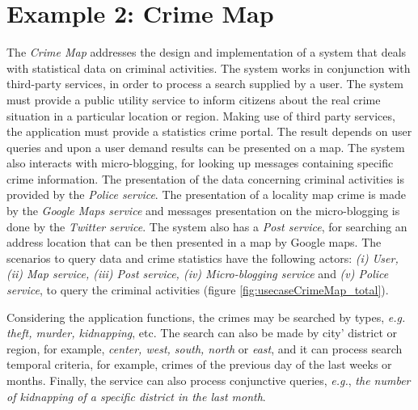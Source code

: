  


   

 
\section{Example 2: Crime Map}
\label{sec:crimes_inpractice}


The \textit{Crime Map}  addresses the design and
implementation of a system that deals with statistical data on criminal activities. The system works
in conjunction with third-party services, in order to process a search supplied
by a user. The system must provide a public utility service to inform
citizens about the real crime situation in a particular location or region.
Making use of third party services, the application must provide a statistics crime portal. The result depends on user queries and upon a user
demand results can be presented on a map. The system also interacts with
micro-blogging, for looking up messages containing specific crime
information. The presentation of the data concerning criminal activities is
provided by the \textit{Police service}. The presentation of a locality map
crime is made by the \textit{Google Maps service} and messages presentation on
the micro-blogging is done by the \textit{Twitter service}. The system also has
a \textit{Post service}, for searching an address location that can be then
presented in a map by Google maps. The scenarios to query data and crime
statistics have the following actors: \textit{(i) User, (ii) Map service, (iii) Post service, (iv) Micro-blogging
service} and \textit{(v) Police service}, to query the criminal activities
(figure \ref{fig:usecaseCrimeMap_total}).

Considering the application functions, the crimes may be searched by types,
\textit{e.g.} \textit{theft, murder, kidnapping}, etc. The search can also be
made by city' district or region, for example, \textit{center, west, south,
north} or \textit{east}, and it can process search temporal criteria, for
example, crimes of the previous day of the last weeks or months. Finally, the
service can also process conjunctive queries, \textit{e.g.}, \textit{the number of kidnapping of a specific district in the last month}.

